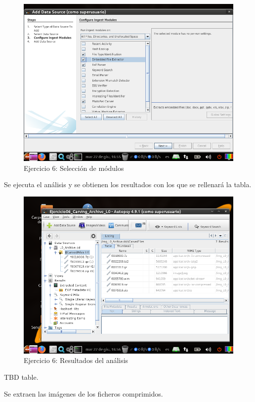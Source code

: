 \documentclass[11pt]{article}
\begin{document}
\begin{figure}[H]
    \caption{Ejercicio 6: Selección de módulos}
    \centering
    \includegraphics[scale=0.7]{e6-4.png}
\end{figure}

Se ejecuta el análisis y se obtienen los resultados con los que se rellenará la tabla.

\begin{figure}[H]
    \caption{Ejercicio 6: Resultados del análisis}
    \centering
    \includegraphics[scale=0.7]{e6-5.png}
\end{figure}

TBD table.

Se extraen las imágenes de los ficheros comprimidos.
\end{document}
